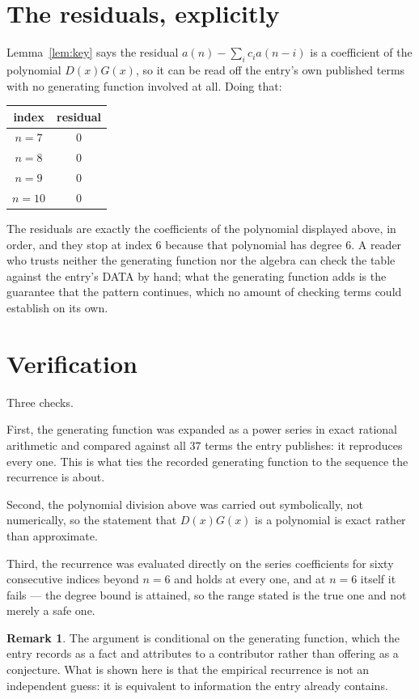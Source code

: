 \documentclass[11pt,a4paper]{article}
\theoremstyle{plain}
\theoremstyle{definition}
\newtheorem{remark}[theorem]{Remark}
\begin{document}
\section{The residuals, explicitly}

Lemma~\ref{lem:key} says the residual $a(n)-\sum_ic_ia(n-i)$ is a coefficient of the
polynomial $D(x)G(x)$, so it can be read off the entry's own published terms with no
generating function involved at all. Doing that:
\begin{center}
\begin{tabular}{cc}
index & residual \\ \hline
$n=7$ & $0$ \\
$n=8$ & $0$ \\
$n=9$ & $0$ \\
$n=10$ & $0$
\end{tabular}
\end{center}
The residuals are exactly the coefficients of the polynomial displayed above, in order, and
they stop at index $6$ because that polynomial has degree $6$. A reader who trusts
neither the generating function nor the algebra can check the table against the entry's DATA
by hand; what the generating function adds is the guarantee that the pattern continues, which
no amount of checking terms could establish on its own.

\section{Verification}

Three checks.

First, the generating function was expanded as a power series in exact rational arithmetic and
compared against all $37$ terms the entry publishes: it reproduces every one. This is
what ties the recorded generating function to the sequence the recurrence is about.

Second, the polynomial division above was carried out symbolically, not numerically, so the
statement that $D(x)G(x)$ is a polynomial is exact rather than approximate.

Third, the recurrence was evaluated directly on the series coefficients for sixty consecutive
indices beyond $n=6$ and holds at every one, and at $n=6$ itself it fails --- the
degree bound is attained, so the range stated is the true one and not merely a safe one.

\begin{remark}
The argument is conditional on the generating function, which the entry records as a fact and
attributes to a contributor rather than offering as a conjecture. What is shown here is that
the empirical recurrence is not an independent guess: it is equivalent to information the
entry already contains.
\end{remark}
\end{document}
